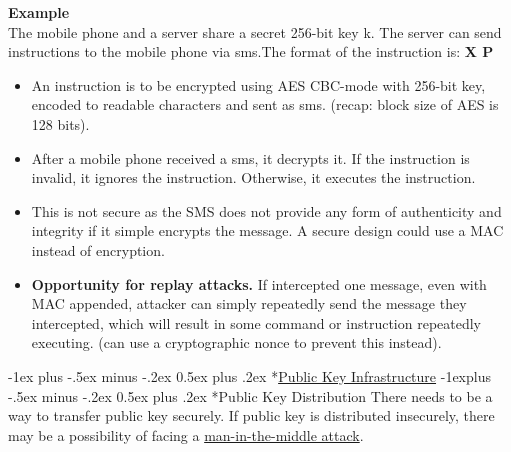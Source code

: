 \documentclass[10pt,landscape]{article}
\makeatletter
\renewcommand{\section}{\@startsection{section}{1}{0mm}%
                                {-1ex plus -.5ex minus -.2ex}%
                                {0.5ex plus .2ex}%
                                {\normalfont\large\bfseries}}
\renewcommand{\subsection}{\@startsection{subsection}{2}{0mm}%
                                {-1explus -.5ex minus -.2ex}%
                                {0.5ex plus .2ex}%
                                {\normalfont\normalsize\bfseries}}
\makeatother
\begin{document}
\begin{multicols*}{3}
\textbf{Example} \\ 
The mobile phone and a server share a secret 256-bit key k. The server can send instructions to the mobile phone via sms.The format of the instruction
is: \textbf{X P} \newline


\begin{center}
\end{center}

\begin{itemize}[noitemsep,wide=0pt, leftmargin=\dimexpr{} + 2\relax]
    \item An instruction is to be encrypted using AES CBC-mode with 256-bit key, encoded to readable characters and sent as sms. (recap: block size of AES is 128 bits). 
    \item After a mobile phone received a sms, it decrypts it. If the instruction is invalid, it ignores the instruction. Otherwise, it executes the instruction. 
    \item This is not secure as the SMS does not provide any form of authenticity and integrity if it simple encrypts the message. A secure design could use a MAC instead of encryption.
    \item \textbf{Opportunity for replay attacks.} If intercepted one message, even with MAC appended, attacker can simply repeatedly send the message they intercepted, which will result in some command or instruction repeatedly executing. (can use a cryptographic nonce to prevent this instead).
    
\end{itemize}
\pagebreak

\section*{\underline{Public Key Infrastructure}}
\subsection*{Public Key Distribution}
There needs to be a way to transfer public key securely. If public key is distributed insecurely,
there may be a possibility of facing a \underline{man-in-the-middle attack}.


\end{multicols*}
\end{document}
